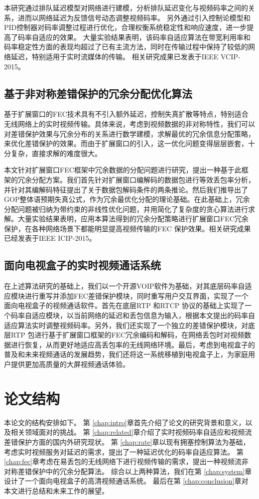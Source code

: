 本研究通过排队延迟模型对网络进行建模，分析排队延迟变化与视频码率之间的关系，进而以网络延迟为反馈信号动态调整视频码率。
另外通过引入控制论模型和PID控制器对码率调整过程进行优化，合理权衡系统稳定性和响应速度，进一步提高了码率自适应的效果。
大量实验结果表明，该码率自适应算法在带宽利用率和码率稳定性方面的表现均超过了已有主流方法，同时在传输过程中保持了较低的网络延迟，特别适用于实时流媒体的传输。
相关研究成果已发表于IEEE VCIP-2015。

\subsection{基于非对称差错保护的冗余分配优化算法}
基于扩展窗口的FEC技术具有不引入额外延迟，控制失真扩散等特点，特别适合无线网络上的实时视频传输。具体来说，考虑到视频数据的非对称特性，我们可以对差错保护效果与冗余分布的关系进行数学建模，求解最优的冗余信息分配策略，来优化差错保护的效果。而由于扩展窗口的引入，这一优化问题变得层层嵌套，十分复杂，直接求解的难度很大。

本文针对扩展窗口FEC框架中冗余数据的分配问题进行研究，提出一种基于此框架的冗余分配方案。我们首先针对扩展窗口编解码的数据包进行等效丢包率分析，并针对其编解码特征提出了关于数据包解码条件的两条推论。然后我们推导出了GOP整体语预期失真公式，作为冗余最优化分配的理论基础。在此基础上，冗余分配问题被归纳为带约束的非线性优化问题，并用简化了复杂度的贪心算法进行求解。大量实验结果表明，应用本算法得到的冗余分配策略进行扩展窗口FEC冗余保护，在各种网络场景下都能明显提高视频传输的FEC 保护效果。相关研究成果已经发表于IEEE ICIP-2015。

\subsection{面向电视盒子的实时视频通话系统}
在上述算法研究的基础上，我们以一个开源VOIP软件为基础，对其底层码率自适应模块进行重写并添加FEC差错保护模块，同时重写用户交互界面，实现了一个面向电视盒子的视频通话软件。首先在底层RTP 和RTCP 协议的基础上实现了一个码率自适应模块，以当前网络的延迟和丢包信息为输入，根据本文提出的码率自适应算法实时调整视频码率。另外，我们还实现了一个独立的差错保护模块，对底层RTP 包进行基于扩展窗口框架的FEC冗余编码和解码，在网络丢包时对视频数据进行恢复，从而更好地适应高丢包率的无线网络环境。最后，考虑到电视盒子的普及和未来视频通话的发展趋势，我们还将这一系统移植到电视盒子上，为家庭用户提供更加高质量的大屏视频通话体验。

\section{论文结构}
本论文的结构安排如下。
第 \ref{chap:intro}章首先介绍了论文的研究背景和意义，以及相关领域面对的挑战。
第 \ref{chap:related}章介绍了实时视频码率自适应和视频流差错保护方面的国内外研究现状。
第 \ref{chap:rate}章以现有拥塞控制算法为基础，考虑实时视频服务对延迟的需求，提出了一种延迟优化的码率自适应算法。
第 \ref{chap:fec}章考虑在易丢包的无线网络下进行视频传输的需求，提出一种视频流非对称差错保护中的冗余分配算法。
综合以上两种算法，我们在第 \ref{chap:system}章设计了一个面向电视盒子的高清视频通话系统。
最后在第 \ref{chap:conclusion}章对本文进行总结和未来工作的展望。
